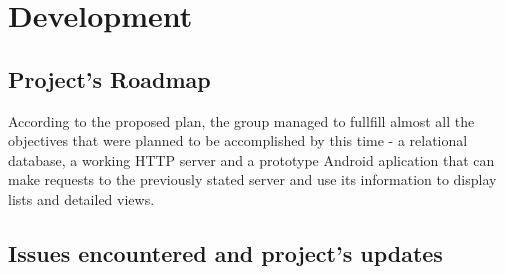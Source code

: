 %
%
\chapter{Development}
    
	\section{Project's Roadmap}

    According to the proposed plan, the group managed to fullfill almost all the objectives
    that were planned to be accomplished by this time - a relational database, a working HTTP server
    and a prototype Android aplication that can make requests to the previously stated server and 
    use its information to display lists and detailed views.

    \section{Issues encountered and project's updates}